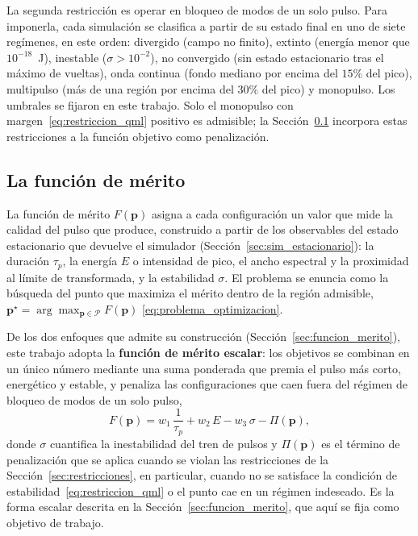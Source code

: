 La segunda restricción es operar en bloqueo de modos de un solo pulso. Para imponerla,
cada simulación se clasifica a partir de su estado final en uno de siete regímenes, en
este orden: divergido (campo no finito), extinto (energía menor que $10^{-18}$~J),
inestable ($\sigma>10^{-2}$), no convergido (sin estado estacionario tras el máximo de
vueltas), onda continua (fondo mediano por encima del $15\%$ del pico), multipulso (más
de una región por encima del $30\%$ del pico) y monopulso. Los umbrales se fijaron en
este trabajo. Solo el monopulso con margen~\eqref{eq:restriccion_qml} positivo es
admisible; la Sección~\ref{sec:funcion_merito_op} incorpora estas restricciones a la
función objetivo como penalización.

\subsection{La función de mérito}
\label{sec:funcion_merito_op}

La función de mérito $F(\mathbf{p})$ asigna a cada configuración un valor que mide la
calidad del pulso que produce, construido a partir de los observables del estado
estacionario que devuelve el simulador (Sección~\ref{sec:sim_estacionario}): la
duración $\tau_p$, la energía $E$ o intensidad de pico, el ancho espectral y la
proximidad al límite de transformada, y la estabilidad $\sigma$. El problema se
enuncia como la búsqueda del punto que maximiza el mérito dentro de la región
admisible,
$\mathbf{p}^\star=\arg\max_{\mathbf{p}\in\mathcal{P}} F(\mathbf{p})$
\eqref{eq:problema_optimizacion}.

De los dos enfoques que admite su construcción (Sección~\ref{sec:funcion_merito}),
este trabajo adopta la \textbf{función de mérito escalar}: los objetivos se combinan
en un único número mediante una suma ponderada que premia el pulso más corto,
energético y estable, y penaliza las configuraciones que caen fuera del régimen de
bloqueo de modos de un solo pulso,
%
\begin{equation}
    F(\mathbf{p}) = w_1\,\frac{1}{\tau_p}
    + w_2\,E - w_3\,\sigma - \Pi(\mathbf{p}),
    \label{eq:merito_op}
\end{equation}
%
donde $\sigma$ cuantifica la inestabilidad del tren de pulsos y $\Pi(\mathbf{p})$ es
el término de penalización que se aplica cuando se violan las restricciones de
la Sección~\ref{sec:restricciones}, en particular, cuando no se satisface la
condición de estabilidad~\eqref{eq:restriccion_qml} o el punto cae en un régimen
indeseado. Es la forma escalar descrita en la
Sección~\ref{sec:funcion_merito}, que aquí se fija como objetivo de trabajo.

